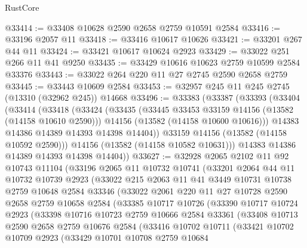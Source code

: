 \begin{lexlean}{RustCore}
\begin{coremodule}
@33414 := @33408 @10628 @2590 @2658 @2759 @10591 @2584
@33416 := @33196 @2057 @11
@33418 := @33416 @10617 @10626
@33421 := @33201 @267 @44 @11
@33424 := @33421 @10617 @10624 @2923
@33429 := @33022 @251 @266 @11 @41 @9250
@33435 := @33429 @10616 @10623 @2759 @10599 @2584 @33376
@33443 := @33022 @264 @220 @11 @27 @2745 @2590 @2658 @2759
@33445 := @33443 @10609 @2584
@33453 := @32957 @245 @11 @245 @2745 (@13310 (@32962 @245)) @14668
@33496 := @33383
    (@33387
      (@33393
        (@33404
          (@33414
            (@33418
              (@33424
                (@33435
                  (@33445 @33453 @33159 @14156 (@13582 (@14158 @10610 @2590)))
                  @14156
                  (@13582 (@14158 @10600 @10616)))
                @14383
                @14386
                @14389
                @14393
                @14398
                @14404))
            @33159
            @14156
            (@13582 (@14158 @10592 @2590)))
          @14156
          (@13582 (@14158 @10582 @10631)))
        @14383
        @14386
        @14389
        @14393
        @14398
        @14404))
@33627 := @32928
    @2065
    @2102
    @11
    @92
    @10743
    @11104
    (@33196
      @2065
      @11
      @10732
      @10741
      (@33201
        @2064
        @44
        @11
        @10732
        @10739
        @2923
        (@33022
          @215
          @2063
          @11
          @41
          @3449
          @10731
          @10738
          @2759
          @10648
          @2584
          @33346
          (@33022
            @2061
            @220
            @11
            @27
            @10728
            @2590
            @2658
            @2759
            @10658
            @2584
            (@33385
              @10717
              @10726
              (@33390
                @10717
                @10724
                @2923
                (@33398
                  @10716
                  @10723
                  @2759
                  @10666
                  @2584
                  @33361
                  (@33408
                    @10713
                    @2590
                    @2658
                    @2759
                    @10676
                    @2584
                    (@33416
                      @10702
                      @10711
                      (@33421
                        @10702
                        @10709
                        @2923
                        (@33429
                          @10701
                          @10708
                          @2759
                          @10684

\end{coremodule}
\end{lexlean}
